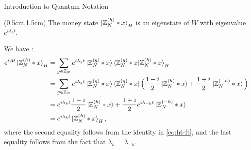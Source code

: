 \documentclass{beamer}
\theoremstyle{definition}
\begin{document}
\begin{frame}{Introduction to Quantum Notation}

    \begin{textblock*}{12cm}(0.5cm,1.5cm)
        The money state $\ket{\mathbb{Z}_N^{(h)} * x}_H$ is an eigenstate of $W$ with eigenvalue $e^{i\lambda_h t}$.
        \vspace{1cm}
    
        We have :
        \begin{align*}
            e^{iAt} \ket{\mathbb{Z}_N^{(h)} * x}_H
            & = \sum_{g \in \mathbb{Z}_N} e^{i\lambda_gt} \ket{\mathbb{Z}_N^{(g)} * x}\braket{\mathbb{Z}_N^{(g)} * x|\mathbb{Z}_N^{(h)} * x}_H \\
            & = \sum_{g \in \mathbb{Z}_N} e^{i\lambda_gt} \ket{\mathbb{Z}_N^{(g)} * x} \bra{\mathbb{Z}_N^{(g)} * x} \Big( \frac{1 - i}{2} \ket{\mathbb{Z}_N^{(h)} * x} + \frac{1 + i}{2} \ket{\mathbb{Z}_N^{(-h)} * x} \Big) \\
            & = e^{i\lambda_{h}t} \frac{1 - i}{2} \ket{\mathbb{Z}_N^{(h)} * x} + \frac{1 + i}{2} e^{i\lambda_{-h}t} \ket{\mathbb{Z}_N^{(-h)} * x} \\
            & = e^{i\lambda_{h}t} \ket{\mathbb{Z}_N^{(h)} * x}_H,
        \end{align*}
        where the second equality follows from the identity in \eqref{eq:ht-ft}, and the last equality follows from the fact that $\lambda_h = \lambda_{-h}$.
    \end{textblock*}


 
 \end{frame}



\end{document}
